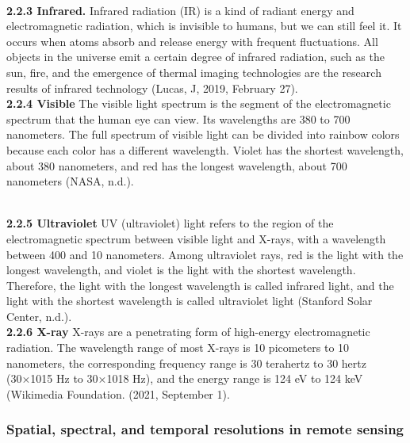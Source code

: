 \documentclass[conference]{IEEEtran}
\begin{document}
\\         
{\bf 2.2.3	Infrared.\rm}
 Infrared radiation (IR) is a kind of radiant energy and electromagnetic radiation, which is invisible to humans, but we can still feel it. It occurs when atoms absorb and release energy with frequent fluctuations. All objects in the universe emit a certain degree of infrared radiation, such as the sun, fire, and the emergence of thermal imaging technologies are the research results of infrared technology (Lucas, J, 2019, February 27).
\\
{\bf 2.2.4	Visible\rm}
 The visible light spectrum is the segment of the electromagnetic spectrum that the human eye can view. Its wavelengths are 380 to 700 nanometers.
 The full spectrum of visible light can be divided into rainbow colors because each color has a different wavelength. Violet has the shortest wavelength, about 380 nanometers, and red has the longest wavelength, about 700 nanometers (NASA, n.d.).
 
\\
{\bf 2.2.5	Ultraviolet\rm}
UV (ultraviolet) light refers to the region of the electromagnetic spectrum between visible light and X-rays, with a wavelength between 400 and 10 nanometers. Among ultraviolet rays, red is the light with the longest wavelength, and violet is the light with the shortest wavelength. Therefore, the light with the longest wavelength is called infrared light, and the light with the shortest wavelength is called ultraviolet light (Stanford Solar Center, n.d.).
\\
{\bf 2.2.6	X-ray\rm}
X-rays are a penetrating form of high-energy electromagnetic radiation. The wavelength range of most X-rays is 10 picometers to 10 nanometers, the corresponding frequency range is 30 terahertz to 30 hertz (30×1015 Hz to 30×1018 Hz), and the energy range is 124 eV to 124 keV (Wikimedia Foundation. (2021, September 1).

\subsubsection{Spatial, spectral, and temporal resolutions in remote sensing}
	
\end{document}
